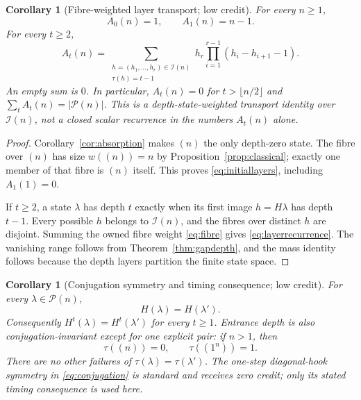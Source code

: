 \documentclass[10pt]{amsart}
\newtheorem{corollary}[theorem]{Corollary}
\theoremstyle{definition}
\newcommand{\Par}{\mathcal P}
\newcommand{\Img}{\mathcal I}
\begin{document}
\begin{corollary}[Fibre-weighted layer transport; low credit]
\label{cor:layers}
For every $n\geq1$,
\begin{equation}
 \label{eq:initiallayers}
 A_0(n)=1,
 \qquad
 A_1(n)=n-1.
\end{equation}
For every $t\geq2$,
\begin{equation}
 \label{eq:layerrecurrence}
 A_t(n)=
 \sum_{\substack{h=(h_1,\ldots,h_r)\in\Img(n)\\
                   \tau(h)=t-1}}
 h_r\prod_{i=1}^{r-1}(h_i-h_{i+1}-1).
\end{equation}
An empty sum is $0$.  In particular, $A_t(n)=0$ for
$t>\lfloor n/2\rfloor$ and $\sum_tA_t(n)=|\Par(n)|$.
This is a depth-state-weighted transport identity over $\Img(n)$, not a
closed scalar recurrence in the numbers $A_t(n)$ alone.
\end{corollary}

\begin{proof}
Corollary~\ref{cor:absorption} makes $(n)$ the only depth-zero state.  The fibre
over $(n)$ has size $w((n))=n$ by Proposition~\ref{prop:classical}; exactly
one member of that fibre is $(n)$ itself.  This proves
\eqref{eq:initiallayers}, including $A_1(1)=0$.

If $t\geq2$, a state $\lambda$ has depth $t$ exactly when its first image
$h=H\lambda$ has depth $t-1$.  Every possible $h$ belongs to $\Img(n)$, and
the fibres over distinct $h$ are disjoint.  Summing the owned fibre
weight \eqref{eq:fibre} gives \eqref{eq:layerrecurrence}.  The vanishing range
follows from Theorem~\ref{thm:gapdepth}, and the mass identity follows because
the depth layers partition the finite state space.
\end{proof}

\begin{corollary}[Conjugation symmetry and timing consequence; low credit]
\label{cor:conjugation}
For every $\lambda\in\Par(n)$,
\begin{equation}
 \label{eq:conjugation}
 H(\lambda)=H(\lambda').
\end{equation}
Consequently $H^t(\lambda)=H^t(\lambda')$ for every $t\geq1$.  Entrance
depth is also conjugation-invariant except for one explicit pair: if $n>1$,
then
\[
 \tau((n))=0,
 \qquad
 \tau((1^n))=1.
\]
There are no other failures of $\tau(\lambda)=\tau(\lambda')$.
The one-step diagonal-hook symmetry in \eqref{eq:conjugation} is standard and
receives zero credit; only its stated timing consequence is used here.
\end{corollary}
\end{document}
